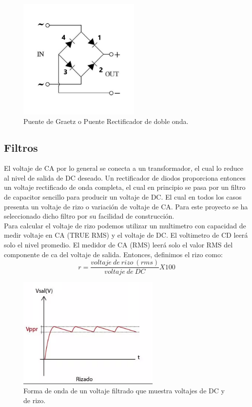 \begin{figure}[H]
\centering
\includegraphics[width=6cm]{capitulo2/figs/Puente_de_diodos.png}
\caption{Puente de Graetz o Puente Rectificador de doble onda.}
\end{figure}


\subsection{Filtros}
El voltaje de CA por lo general se conecta a un transformador, el cual lo reduce al nivel de salida de DC deseado. Un rectificador de diodos proporciona entonces un voltaje rectificado de onda completa, el cual en principio se pasa por un filtro de capacitor sencillo para producir un voltaje de DC. El cual en todos los casos presenta un voltaje de rizo o variación de voltaje de CA. Para este proyecto se ha seleccionado dicho filtro por su facilidad de construcción. \\

Para calcular el voltaje de rizo podemos utilizar un multimetro con capacidad de medir voltaje en CA (TRUE RMS) y el voltaje de DC. El voltimetro de CD leerá solo el nivel promedio. El medidor de CA (RMS) leerá solo el valor RMS del componente de ca del voltaje de salida. Entonces, definimos el rizo como:\\

\begin{equation}
r=\frac{voltaje\:  de\:  rizo\:  (rms)}{voltaje\:  de\:  DC}X100
\end{equation}

\begin{figure}[H]
\centering
\includegraphics[width=7cm]{capitulo3/figs/risado.png}
\caption{ Forma de onda de un voltaje filtrado que muestra voltajes de DC y de rizo.}
\end{figure}

